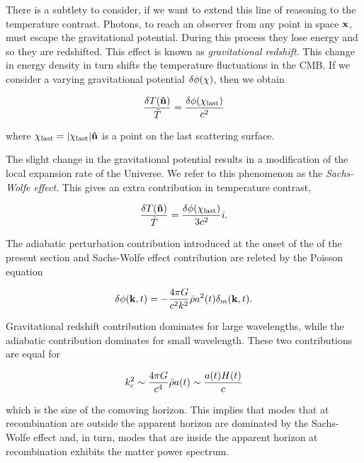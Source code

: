 There is a subtlety to consider, if we want to extend this line of reasoning
to the temperature contrast. Photons, to reach an observer from any point
in space $\vb{x}$, must escape the gravitational potential. During this
process they lose energy and so they are redshifted. This effect is known
as \emph{gravitational redshift}. This change in energy density in turn
shifts the temperature fluctuations in the CMB. If we consider a varying
gravitational potential $\delta \phi\qty(\vb{\chi})$, then we obtain

\begin{equation}
        \frac{\var{T\qty(\vu{n})}}{\bar T} =
        \frac{\var{\phi\qty(\vb{\chi}_\text{last})}}{c^2}
\end{equation}

where $\vb{\chi}_\text{last} = \abs{\vb{\chi}_\text{last}} \vu{n}$ is a
point on the last scattering surface.

The slight change in the gravitational potential results in a modification
of the local expansion rate of the Universe. We refer to this phenomenon as
the \emph{Sachs-Wolfe effect}. This gives an extra contribution in
temperature contrast,

\begin{equation}
        \frac{\var{T\qty(\vu{n})}}{\bar T} =
        \frac{\var{\phi\qty(\vb{\chi}_\text{last})}}{3c^2}i.
\end{equation}

The adiabatic perturbation contribution introduced at the onset of the of
the present section and Sachs-Wolfe effect contribution are releted by the
Poisson equation

\begin{equation}
        \var{\phi\qty(\vb{k},t)} = -\frac{4\pi G}{c^2 k^2}
        \bar \rho a^2\qty(t) \delta_m\qty(\vb{k},t).
\end{equation}

Gravitational redshift contribution dominates for large wavelengths, while
the adiabatic contribution dominates for small wavelength. These two
contributions are equal for

\begin{equation}
        k^2_c \sim \frac{4\pi G}{c^4}\bar \rho a\qty(t) \sim
        \frac{a\qty(t)H\qty(t)}{c}
\end{equation}

which is the size of the comoving horizon. This implies that modes that at
recombination are outside the apparent horizon are dominated by the
Sachs-Wolfe effect and, in turn, modes that are inside the apparent horizon
at recombination exhibits the matter power spectrum.

